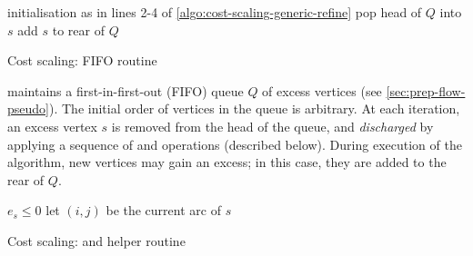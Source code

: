 \begin{algorithm}
\begin{algorithmic}[1]
        \State initialisation as in lines 2-4 of \cref{algo:cost-scaling-generic-refine}
         
            \State pop head of $Q$ into $s$
            \State {} 
                \State add $s$ to rear of $Q$
                \Break
            \EndIf
        \EndWhile
    \EndFunction
\end{algorithmic}
\caption{Cost scaling: FIFO  routine}
\label{algo:cost-scaling-first-active-refine}
\end{algorithm}

 maintains a first-in-first-out (FIFO) queue $Q$ of excess vertices (see \cref{sec:prep-flow-pseudo}). The initial order of vertices in the queue is arbitrary. At each iteration, an excess vertex $s$ is removed from the head of the queue, and \emph{discharged} by applying a sequence of  and  operations (described below). During execution of the algorithm, new vertices may gain an excess; in this case, they are added to the rear of $Q$.

\begin{algorithm}
\begin{algorithmic}[1]
        \Repeat
            \State {}
        \Until $e_s \leq 0$
    \EndFunction
    \setcounter{ALG@line}{0}
    \Statex
        \State let $(i,j)$ be the current arc of $s$
         
        \Else
                \State {}
            \Else
            \EndIf
        \EndIf
    \EndFunction
\end{algorithmic}
\caption{Cost scaling:  and helper routine }
\label{algo:cost-scaling-discharge}
\end{algorithm}

